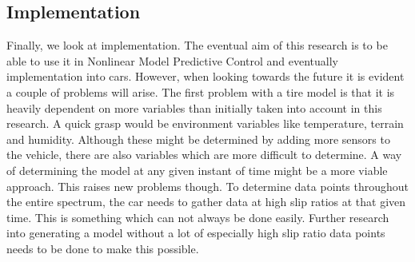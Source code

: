 \subsection{Implementation}
Finally, we look at implementation. The eventual aim of this research is to be able to use it in Nonlinear Model Predictive Control and eventually implementation into cars. However, when looking towards the future it is evident a couple of problems will arise. The first problem with a tire model is that it is heavily dependent on more variables than initially taken into account in this research. A quick grasp would be environment variables like temperature, terrain and humidity. Although these might be determined by adding more sensors to the vehicle, there are also variables which are more difficult to determine. A way of determining the model at any given instant of time might be a more viable approach. This raises new problems though. To determine data points throughout the entire spectrum, the car needs to gather data at high slip ratios at that given time. This is something which can not always be done easily. Further research into generating a model without a lot of especially high slip ratio data points needs to be done to make this possible.